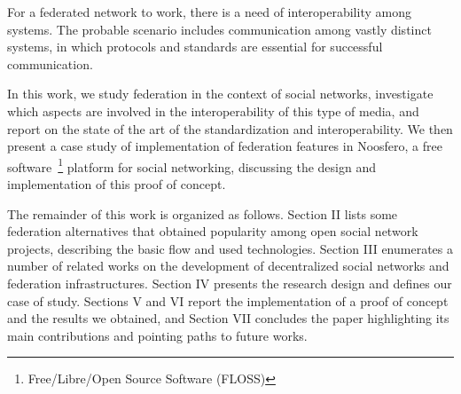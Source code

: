 For a federated network to work, there is a need of interoperability
among systems. The probable scenario includes communication among
vastly distinct systems, in which protocols and standards are essential
for successful communication.

In this work, we study federation in the context of social networks,
investigate which aspects are involved in the interoperability of this type of
media, and report on the state of the art of the standardization and
interoperability. We then present a case study of implementation of federation
features in Noosfero, a free software~\footnote{Free/Libre/Open Source Software
(FLOSS)} platform for social networking, discussing the design and
implementation of this proof of concept.

The remainder of this work is organized as follows. Section II lists some federation
alternatives that obtained popularity among open social network projects, describing
the basic flow and used technologies. Section III enumerates a number of related
works on the development of decentralized social networks and federation
infrastructures. Section IV presents the research design and defines our case of
study. Sections V and VI report the implementation of a proof of concept and the
results we obtained, and Section VII concludes the paper highlighting its main
contributions and pointing paths to future works.
